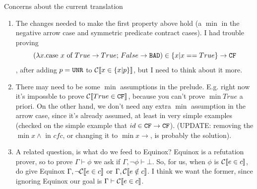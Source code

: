 \documentclass[preprint]{sigplanconf}
\begin{document}
{\begin{enumerate}
\end{enumerate}

Concerns about the current translation
\protect \begin{enumerate}
\item The changes needed to make the first property above hold (a $\min{}$ in the negative
  arrow case and symmetric predicate contract cases).
  I had trouble proving
  \protect \[
  (\lambda x. \text{case $x$ of $True \to True$; $False \to \texttt{BAD}$}) 
  \in \{x|x==True\} \to \texttt{CF}
  \]
  , after adding $p = \texttt{UNR}$ to $\mathcal{C} \llbracket x \in \{x|p\} \rrbracket$, but I need to think about it more.

\item There may need to be some $\min{}$ assumptions in the prelude.  E.g. right now 
  it's impossble to prove $\mathcal{C} \llbracket True \in \texttt{CF} \rrbracket$, because you can't prove 
  $\min{True}$ a priori.  On the other hand, we don't need any extra 
  $\min{}$ assumption in the arrow case, since it's already assumed, at least in
  very simple examples (checked on the simple
  example that $id \in \texttt{CF} \to \texttt{CF}$). (UPDATE: removing the $\min{x} \land$ in $cfc$, 
  or changing it to $\min{x} \to$, is probably the solution).

\item A related question, is what do we feed to Equinox?  Equinox is a 
  refutation prover, so to prove $\Gamma \vdash \phi$ we ask if 
  $\Gamma,\lnot \phi \vdash \bot$.  So, for us, when $\phi$ is $\mathcal{C} \llbracket e \in c \rrbracket$, do
  give Equinox $\Gamma,\lnot \mathcal{C} \llbracket e \in c \rrbracket$ or $\Gamma, \mathcal{C} \llbracket e \notin c \rrbracket$.  I think
  we want the former, since ignoring Equinox our goal is $\Gamma \vdash \mathcal{C} \llbracket e \in c \rrbracket$.
\end{enumerate}
}
\end{document}
